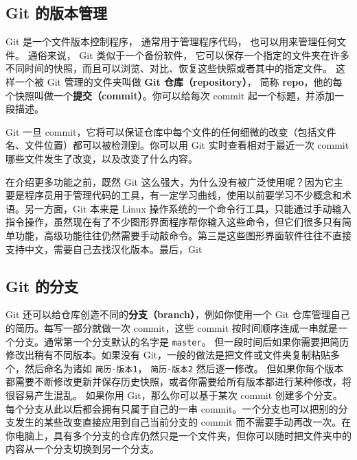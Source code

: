 
\begin{issues}
\issueTODO
\end{issues}

\subsection{Git 的版本管理}
Git 是一个文件版本控制程序， 通常用于管理程序代码， 也可以用来管理任何文件。 通俗来说， Git 类似于一个备份软件， 它可以保存一个指定的文件夹在许多不同时间的快照，而且可以浏览、对比、恢复这些快照或者其中的指定文件。 这样一个被 Git 管理的文件夹叫做 \textbf{Git 仓库（repository）}， 简称 \textbf{repo}，他的每个快照叫做一个\textbf{提交（commit）}。你可以给每次 commit 起一个标题，并添加一段描述。


Git 一旦 commit，它将可以保证仓库中每个文件的任何细微的改变（包括文件名、文件位置）都可以被检测到。你可以用 Git 实时查看相对于最近一次 commit 哪些文件发生了改变，以及改变了什么内容。

在介绍更多功能之前，既然 Git 这么强大，为什么没有被广泛使用呢？因为它主要是程序员用于管理代码的工具，有一定学习曲线，使用以前要学习不少概念和术语。另一方面，Git 本来是 Linux 操作系统的一个命令行工具，只能通过手动输入指令操作，虽然现在有了不少图形界面程序帮你输入这些命令，但它们很多只有简单功能，高级功能往往仍然需要手动敲命令。第三是这些图形界面软件往往不直接支持中文，需要自己去找汉化版本。最后，Git

\subsection{Git 的分支}
Git 还可以给仓库创造不同的\textbf{分支（branch）}，例如你使用一个 Git 仓库管理自己的简历。每写一部分就做一次 commit，这些 commit 按时间顺序连成一串就是一个分支。通常第一个分支默认的名字是 \verb`master`。 但一段时间后如果你需要把简历修改出稍有不同版本。如果没有 Git，一般的做法是把文件或文件夹复制粘贴多个，然后命名为诸如 \verb`简历-版本1`， \verb`简历-版本2` 然后逐一修改。 但如果你每个版本都需要不断修改更新并保存历史快照，或者你需要给所有版本都进行某种修改，将很容易产生混乱。 如果你用 Git，那么你可以基于某次 commit 创建多个分支。每个分支从此以后都会拥有只属于自己的一串 commit。一个分支也可以把别的分支发生的某些改变直接应用到自己当前分支的 commit 而不需要手动再改一次。在你电脑上，具有多个分支的仓库仍然只是一个文件夹，但你可以随时把文件夹中的内容从一个分支切换到另一个分支。

